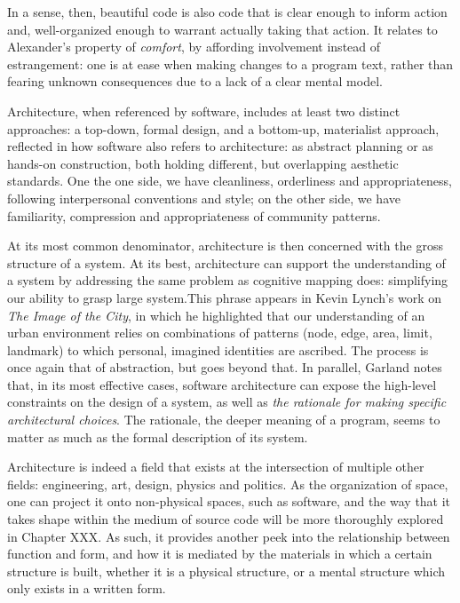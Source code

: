 
In a sense, then, beautiful code is also code that is clear enough to inform action and, well-organized enough to warrant actually taking that action. It relates to Alexander's property of \emph{comfort}, by affording involvement instead of estrangement: one is at ease when making changes to a program text, rather than fearing unknown consequences due to a lack of a clear mental model.

\spacer

Architecture, when referenced by software, includes at least two distinct approaches: a top-down, formal design, and a bottom-up, materialist approach, reflected in how software also refers to architecture: as abstract planning or as hands-on construction, both holding different, but overlapping aesthetic standards. One the one side, we have cleanliness, orderliness and appropriateness, following interpersonal conventions and style; on the other side, we have familiarity, compression and appropriateness of community patterns.

At its most common denominator, architecture is then concerned with the gross structure of a system. At its best, architecture can support the understanding of a system by addressing the same problem as cognitive mapping does: simplifying our ability to grasp large system.This phrase appears in Kevin Lynch's work on \emph{The Image of the City}, in which he highlighted that our understanding of an urban environment relies on combinations of patterns (node, edge, area, limit, landmark) to which personal, imagined identities are ascribed. The process is once again that of abstraction, but goes beyond that. In parallel, Garland notes that, in its most effective cases, software architecture can expose the high-level constraints on the design of a system, as well as \emph{the rationale for making specific architectural choices}. The rationale, the deeper meaning of a program, seems to matter as much as the formal description of its system.

Architecture is indeed a field that exists at the intersection of multiple other fields: engineering, art, design, physics and politics. As the organization of space, one can project it onto non-physical spaces, such as software, and the way that it takes shape within the medium of source code will be more thoroughly explored in Chapter XXX. As such, it provides another peek into the relationship between function and form, and how it is mediated by the materials in which a certain structure is built, whether it is a physical structure, or a mental structure which only exists in a written form.

